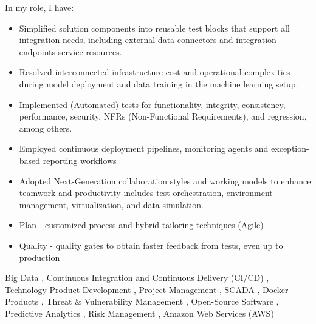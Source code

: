 \begin{experiences}
{    In my role, I have:
    \begin{itemize}    
        \item Simplified solution components into reusable test blocks that support all integration needs, including external data connectors and integration endpoints service resources.
        \item  Resolved interconnected infrastructure cost and operational complexities during model deployment and data training in the machine learning setup.
        \item  Implemented (Automated) tests for functionality, integrity, consistency, performance, security, NFRs (Non-Functional Requirements), and regression, among others.
        \item Employed continuous deployment pipelines, monitoring agents and exception-based reporting workflows
        \item  Adopted Next-Generation collaboration styles and working models to enhance teamwork and productivity includes test orchestration, environment management, virtualization, and data simulation.
        \item Plan - customized process and hybrid tailoring techniques (Agile) 
    \item Quality - quality gates to obtain faster feedback from tests, even up to production
     \end{itemize}
                    }
                   {Big Data , Continuous Integration and Continuous Delivery (CI/CD) , Technology Product Development , Project Management , SCADA , Docker Products , Threat \& Vulnerability Management , Open-Source Software , Predictive Analytics , Risk Management , Amazon Web Services (AWS)} 
  


\end{experiences}

